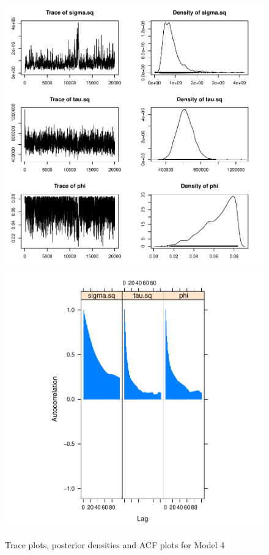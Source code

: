 \documentclass[12pt]{article}
\begin{document}
	\begin{figure}[H]
		\centering
		\includegraphics[scale=0.55]{Plots_North+South/v4_both.pdf}
		\includegraphics[scale=0.55]{Plots_North+South/v4_both_acf.pdf}
		\caption{Trace plots, posterior densities and ACF plots for Model 4}
	\end{figure}
\end{document}
